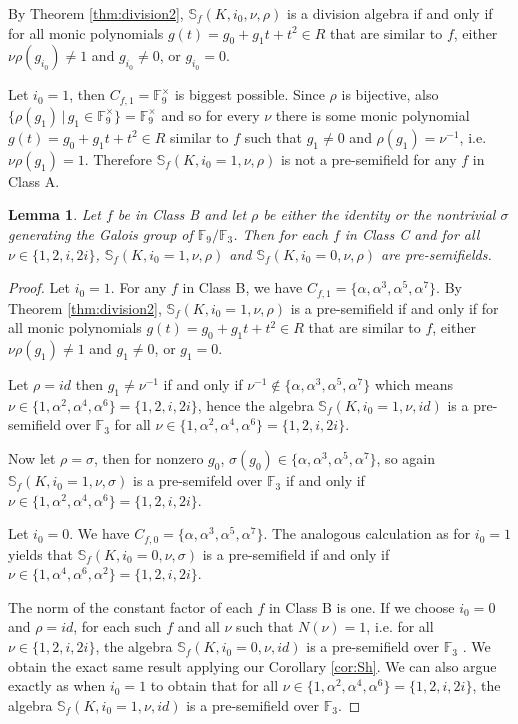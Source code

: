\documentclass[12pt]{amsart}
\theoremstyle{plain}
\newtheorem{lemma}[theorem]{Lemma}
\theoremstyle{definition}
\numberwithin{equation}{section}
\numberwithin{figure}{section}
\begin{document}
By Theorem \ref{thm:division2},
$\mathbb{S}_f(K,i_0,\nu,\rho)$  is a division algebra  if and only if  for all
 monic polynomials  $g(t)=g_0+g_1t+t^2\in R$ that are similar to $f$, either $\nu\rho(g_{i_0})\not =1$ and $g_{i_0}\not=0$, or $g_{i_0}=0$.


 Let $i_0=1$, then  $C_{f,{1}}=\mathbb{F}_9^\times$ is biggest possible. Since $\rho$ is bijective, also $\{\rho(g_{1})\,|\, g_1\in \mathbb{F}_9^\times\}=\mathbb{F}_9^\times$ and so for every $\nu$ there is some monic polynomial $g(t)=g_0+g_1t+t^2\in R$ similar to $f$
 such that $g_{1}\not=0$ and $\rho(g_{1}) =\nu^{-1}$, i.e. $\nu\rho(g_{1}) =1$.
Therefore
$\mathbb{S}_f(K,i_0=1,\nu,\rho)$ is not a pre-semifield for any $f$ in Class A.


\begin{lemma}
Let $f$ be in Class B and let $\rho$ be either the identity or the nontrivial $\sigma$ generating the Galois group of $\mathbb{F}_9/\mathbb{F}_3$. Then for each $f$ in Class C and  for all $\nu\in \{ 1,2,i,2i \}$,
$\mathbb{S}_f(K,i_0=1,\nu,\rho)$ and $\mathbb{S}_f(K,i_0=0,\nu,\rho)$ are pre-semifields.
\end{lemma}

\begin{proof}
  Let $i_0=1$.   For any $f$ in Class B, we have $C_{f,1}=\{ \alpha, \alpha^3, \alpha^5,\alpha^7\}.$
  By Theorem \ref{thm:division2},
$\mathbb{S}_f(K,i_0=1,\nu,\rho)$  is a pre-semifield  if and only if  for all
 monic polynomials  $g(t)=g_0+g_1t+t^2\in R$ that are similar to $f$, either $\nu\rho(g_{1})\not =1$ and $g_{1}\not=0$, or $g_{1}=0$.

 Let $\rho=id$ then $g_{1}\not =\nu^{-1}$ if and only if $\nu^{-1}\not\in \{ \alpha, \alpha^3, \alpha^5,\alpha^7\}$ which means $\nu\in \{ 1,\alpha^2, \alpha^4, \alpha^6\}=\{ 1,2,i,2i\}$, hence the algebra  $\mathbb{S}_f(K,i_0=1,\nu,id)$ is a pre-semifield over $\mathbb{F}_3$ for all
 $\nu\in \{ 1,\alpha^2, \alpha^4, \alpha^6\}=\{ 1,2,i,2i\}$.

 Now let $\rho=\sigma$, then for nonzero $g_0$,  $\sigma(g_{0})\in\{ \alpha, \alpha^3, \alpha^5, \alpha^7  \}$, so again $\mathbb{S}_f(K,i_0=1,\nu,\sigma)$  is a pre-semifeld over $\mathbb{F}_3$ if and only if $\nu\in \{ 1,\alpha^2, \alpha^4,\alpha^6\}=\{1,2, i,2i\}$.

Let $i_0=0$.  We have $C_{f,0}=\{ \alpha, \alpha^3, \alpha^5,\alpha^7\}.$
   The analogous calculation as for $i_0=1$ yields that
   $\mathbb{S}_f(K,i_0=0,\nu,\sigma)$ is a pre-semifield if and only if $\nu\in \{ 1, \alpha^4,\alpha^6,\alpha^2 \}=\{ 1,2,i,2i \}$.

     The norm of the constant factor of each $f$ in Class B is one. If we choose $i_0=0$ and $\rho=id$, for each such $f$ and all $\nu$ such that $N(\nu)=1$, i.e. for all $\nu\in \{ 1,2,i,2i \}$, the algebra $\mathbb{S}_f(K,i_0=0,\nu,id)$ is a pre-semifield over $\mathbb{F}_3$ \cite[Theorem 7]{Sheekey}. We obtain the exact same result applying our Corollary \ref{cor:Sh}. We can also argue exactly as when $i_0=1$ to obtain that
  for all $\nu\in \{ 1,\alpha^2, \alpha^4, \alpha^6\}=\{ 1,2,i,2i\}$, the algebra $\mathbb{S}_f(K,i_0=1,\nu,id)$ is a pre-semifield over $\mathbb{F}_3$.
\end{proof}
\end{document}
